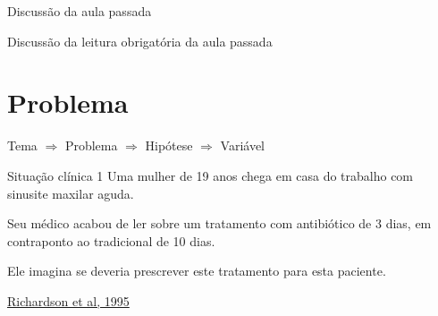 \documentclass{beamer}
\begin{document}

\begin{frame}{Discussão da aula passada}
  \begin{block}{}
    Discussão da leitura obrigatória da aula passada
  \end{block}
\end{frame}

\section{Problema}

\begin{frame}
  \begin{center}
    Tema $\Rightarrow$ Problema $\Rightarrow$ Hipótese $\Rightarrow$ Variável

    \bigskip
  \end{center}
\end{frame}

\begin{frame}
  \begin{exampleblock}{Situação clínica 1}
    \footnotesize
    Uma mulher de 19 anos chega em casa do trabalho com sinusite maxilar aguda.

    \bigskip
    Seu médico acabou de ler sobre um tratamento com antibiótico de 3 dias, em contraponto ao tradicional de 10 dias.

    \bigskip
    Ele imagina se deveria prescrever este tratamento para esta paciente.
  \end{exampleblock}

  \vfill
  \scriptsize
  \hfill \href{https://acpjc.acponline.org/Content/123/3/issue/ACPJC-1995-123-3-A12.htm}
      {Richardson et al, 1995}
\end{frame}
\end{document}
